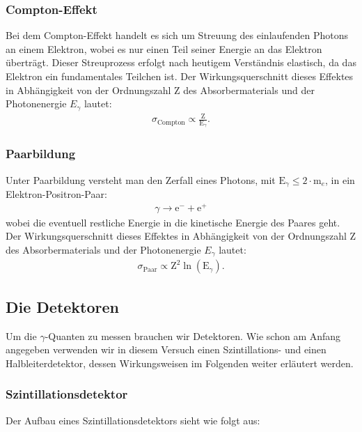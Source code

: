 \documentclass[12pt,a4paper,titlepage]{article}
\begin{document}
\subsubsection{Compton-Effekt}

\noindent  Bei dem Compton-Effekt handelt es sich um Streuung des einlaufenden Photons an einem Elektron, wobei es nur einen Teil seiner Energie an das Elektron überträgt. Dieser Streuprozess erfolgt nach heutigem Verständnis elastisch, da das Elektron ein fundamentales Teilchen ist. Der Wirkungsquerschnitt dieses Effektes in Abhängigkeit von der Ordnungszahl Z des Absorbermaterials und der Photonenergie $E_\gamma$ lautet:
\begin{align}
\sigma_{\text{Compton}} \propto \frac{\text{Z}}{\text{E}_\gamma}.
\end{align}

\subsubsection{Paarbildung}

Unter Paarbildung versteht man den Zerfall eines Photons, mit $\text{E}_\gamma \le 2 \cdot \text{m}_e$, in ein Elektron-Positron-Paar:
\begin{align}
\gamma \rightarrow \text{e}^- + \text{e}^+ 
\end{align}
wobei die eventuell restliche Energie in die kinetische Energie des Paares geht. Der Wirkungsquerschnitt dieses Effektes in Abhängigkeit von der Ordnungszahl Z des Absorbermaterials und der Photonenergie $E_\gamma$ lautet:
\begin{align}
\sigma_{\text{Paar}} \propto \text{Z}^2 \ln(\text{E}_\gamma).
\end{align}
\newpage
\subsection{Die Detektoren}

Um die $\gamma$-Quanten zu messen brauchen wir Detektoren. Wie schon am Anfang angegeben verwenden wir in diesem Versuch einen Szintillations- und einen Halbleiterdetektor, dessen Wirkungsweisen im Folgenden weiter erläutert werden. 

\subsubsection{Szintillationsdetektor}

Der Aufbau eines Szintillationsdetektors sieht wie folgt aus:\\
\end{document}
